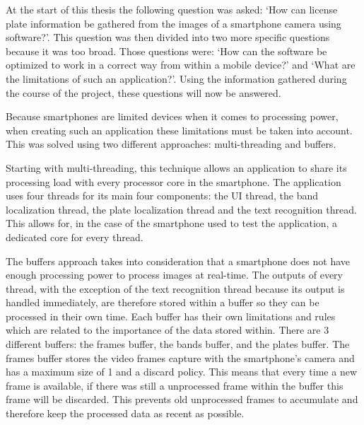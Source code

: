 
At the start of this thesis the following question was asked: `How can license plate information be gathered from the images of a smartphone camera using software?'. This question was then divided into two more specific questions because it was too broad. Those questions were: `How can the software be optimized to work in a correct way from within a mobile device?' and `What are the limitations of such an application?'. Using the information gathered during the course of the project, these questions will now be answered.


Because smartphones are limited devices when it comes to processing power, when creating such an application these limitations must be taken into account. This was solved using two different approaches: multi-threading and buffers.

Starting with multi-threading, this technique allows an application to share its processing load with every processor core in the smartphone. The application uses four threads for its main four components: the UI thread, the band localization thread, the plate localization thread and the text recognition thread. This allows for, in the case of the smartphone used to test the application, a dedicated core for every thread.

The buffers approach takes into consideration that a smartphone does not have enough processing power to process images at real-time. The outputs of every thread, with the exception of the text recognition thread because its output is handled immediately, are therefore stored within a buffer so they can be processed in their own time. Each buffer has their own limitations and rules which are related to the importance of the data stored within. There are 3 different buffers: the frames buffer, the bands buffer, and the plates buffer. The frames buffer stores the video frames capture with the smartphone's camera and has a maximum size of 1 and a discard policy. This means that every time a new frame is available, if there was still a unprocessed frame within the buffer this frame will be discarded. This prevents old unprocessed frames to accumulate and therefore keep the processed data as recent as possible.



